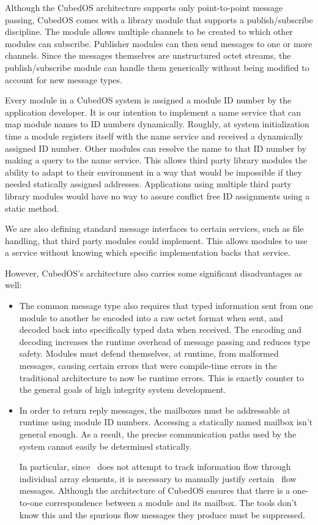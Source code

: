 Although the CubedOS architecture supports only point-to-point message passing, CubedOS comes
with a library module that supports a publish/subscribe discipline. The module allows multiple
channels to be created to which other modules can subscribe. Publisher modules can then send
messages to one or more channels. Since the messages themselves are unstructured octet streams,
the publish/subscribe module can handle them generically without being modified to account for
new message types.

Every module in a CubedOS system is assigned a module ID number by the application developer. It
is our intention to implement a name service that can map module names to ID numbers
dynamically. Roughly, at system initialization time a module registers itself with the name
service and received a dynamically assigned ID number. Other modules can resolve the name to
that ID number by making a query to the name service. This allows third party library modules
the ability to adapt to their environment in a way that would be impossible if they needed
statically assigned addresses. Applications using multiple third party library modules would
have no way to assure conflict free ID assignments using a static method.

We are also defining standard message interfaces to certain services, such as file handling,
that third party modules could implement. This allows modules to use a service without knowing
which specific implementation backs that service.

However, CubedOS's architecture also carries some significant disadvantages as well:

\begin{itemize}

\item
  The common message type also requires that typed information sent from one module to another
  be encoded into a raw octet format when sent, and decoded back into specifically typed data
  when received. The encoding and decoding increases the runtime overhead of message passing and
  reduces type safety. Modules must defend themselves, at runtime, from malformed messages,
  causing certain errors that were compile-time errors in the traditional architecture to now be
  runtime errors. This is exactly counter to the general goals of high integrity system
  development.

\item In order to return reply messages, the mailboxes must be addressable at runtime using
  module ID numbers. Accessing a statically named mailbox isn't general enough. As a result, the
  precise communication paths used by the system cannot easily be determined statically.

  In particular, since \SPARK\ does not attempt to track information flow through individual
  array elements, it is necessary to manually justify certain \SPARK\ flow messages.  Although the architecture of CubedOS ensures that there
  is a one-to-one correspondence between a module and its mailbox. The tools don't know this and
  the spurious flow messages they produce must be suppressed.
\end{itemize}

